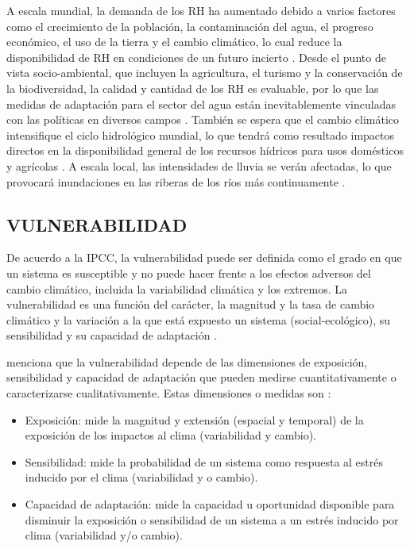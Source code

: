 \documentclass[12pt]{article}
\begin{document}
A escala mundial, la demanda de los RH ha aumentado debido a varios factores como el crecimiento de la población, la contaminación del agua, el progreso económico, el uso de la tierra y el cambio climático, lo cual reduce la disponibilidad de RH en condiciones de un futuro incierto \citep{Davies2011}. Desde el punto de vista socio-ambiental, que incluyen la agricultura, el turismo y la conservación de la biodiversidad, la calidad y cantidad de los RH es evaluable, por lo que las medidas de adaptación para el sector del agua están inevitablemente vinculadas con las políticas en diversos campos \citep{Field2014}. También se espera que el cambio climático intensifique el ciclo hidrológico mundial, lo que tendrá como resultado impactos directos en la disponibilidad general de los recursos hídricos para usos domésticos y agrícolas \citep{Huntington2006}. A escala local, las intensidades de lluvia se verán afectadas, lo que provocará inundaciones en las riberas de los ríos más continuamente \citep{Wilby2010}.

\subsection{VULNERABILIDAD}

De acuerdo a la IPCC, la vulnerabilidad puede ser definida como el grado en que un sistema es susceptible y no puede hacer frente a los efectos adversos del cambio climático, incluida la variabilidad climática y los extremos. La vulnerabilidad es una función del carácter, la magnitud y la tasa de cambio climático y la variación a la que está expuesto un sistema (social-ecológico), su sensibilidad y su capacidad de adaptación \citep{parry2007climate}.

\citet{nelitz2013tools} menciona que la vulnerabilidad depende de las dimensiones de exposición, sensibilidad y capacidad de adaptación que pueden medirse cuantitativamente o caracterizarse cualitativamente. Estas dimensiones o medidas son \citep{glick2011scanning,fussel2006climate}:

\begin{itemize}
    \item Exposición: mide la magnitud y extensión (espacial y temporal) de la exposición de los impactos al clima (variabilidad y cambio).
    \item Sensibilidad: mide la probabilidad de un sistema como respuesta al estrés inducido por el clima (variabilidad y o cambio).
    \item Capacidad de adaptación: mide la capacidad u oportunidad disponible para disminuir la exposición o sensibilidad de un sistema a un estrés inducido por clima (variabilidad y/o cambio).
\end{itemize}
\end{document}
